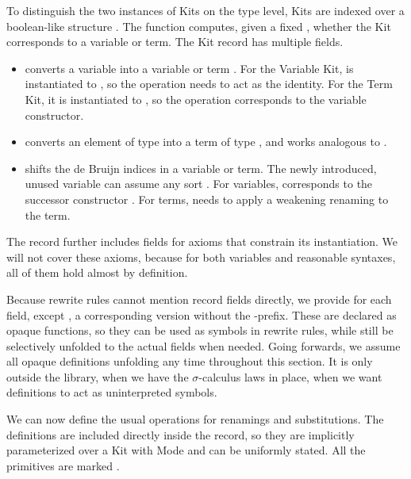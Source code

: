 \documentclass[screen,nonacm]{acmart}
\begin{document}
\noindent To distinguish the two instances of Kits on the type level, Kits are indexed over
a boolean-like structure . The  function computes,
given a fixed , whether the Kit corresponds to a variable or
term. The Kit record has multiple fields.
\begin{itemize}
      \item {} converts a variable into a variable or term   .
            For the Variable Kit,  is instantiated to , so the operation needs to act as the identity.
            For the Term Kit, it is instantiated to , so the operation corresponds to the variable constructor.
      \item {} converts an element of type    into a term of type   , and works analogous to .
      \item {} shifts the de Bruijn indices in a variable or term.
            The newly introduced, unused variable  can assume any sort .
            For variables,  corresponds to the successor constructor .
            For terms,  needs to apply a weakening renaming to the term.
\end{itemize}

\noindent The  record further includes fields for axioms that constrain
its instantiation. We will not cover these axioms, because for both variables
and reasonable syntaxes, all of them hold almost by definition.

Because rewrite rules cannot mention record fields directly, we provide for
each field, except , a corresponding version without the
-prefix. These are declared as opaque functions, so they can be
used as symbols in rewrite rules, while still be selectively unfolded to the
actual fields when needed. Going forwards, we assume all opaque definitions
unfolding any time throughout this section. It is only outside the library,
when we have the $σ$-calculus laws in place, when we want definitions to act as
uninterpreted symbols.

We can now define the usual operations for renamings and substitutions. The
definitions are included directly inside the  record, so they
are implicitly parameterized over a Kit  with Mode 
and can be uniformly stated. All the primitives are marked .
\end{document}
